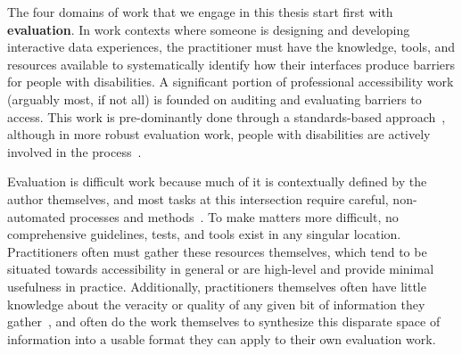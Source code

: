 \documentclass[12pt]{cmuthesis}
\begin{document}


The four domains of work that we engage in this thesis start first with \textbf{evaluation}. In work contexts where someone is designing and developing interactive data experiences, the practitioner must have the knowledge, tools, and resources available to systematically identify how their interfaces produce barriers for people with disabilities. A significant portion of professional accessibility work (arguably most, if not all) is founded on auditing and evaluating barriers to access. This work is pre-dominantly done through a standards-based approach~\cite{WCAG}, although in more robust evaluation work, people with disabilities are actively involved in the process~\cite{Power2012Guidelines}.

Evaluation is difficult work because much of it is contextually defined by the author themselves, and most tasks at this intersection require careful, non-automated processes and methods~\cite{Power2012Guidelines,Deque2021Automated}. To make matters more difficult, no comprehensive guidelines, tests, and tools exist in any singular location. Practitioners often must gather these resources themselves, which tend to be situated towards accessibility in general or are high-level and provide minimal usefulness in practice. Additionally, practitioners themselves often have little knowledge about the veracity or quality of any given bit of information they gather~\cite{Sharif2024Challenges,Joyner2022Wild}, and often do the work themselves to synthesize this disparate space of information into a usable format they can apply to their own evaluation work.
\end{document}
